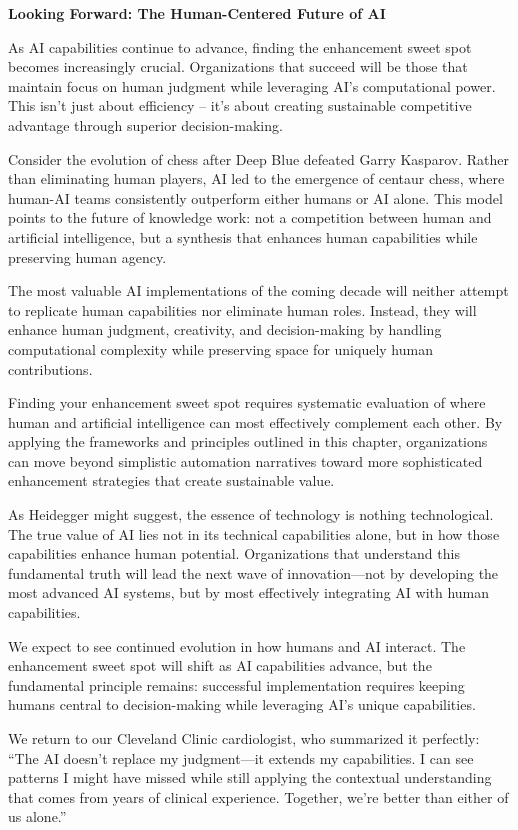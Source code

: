 \documentclass[
  Letterpaper,
]{scrbook}
\begin{document}
\textbf{Looking Forward: The Human-Centered Future of AI}

As AI capabilities continue to advance, finding the enhancement sweet
spot becomes increasingly crucial. Organizations that succeed will be
those that maintain focus on human judgment while leveraging AI's
computational power. This isn't just about efficiency -- it's about
creating sustainable competitive advantage through superior
decision-making.

Consider the evolution of chess after Deep Blue defeated Garry Kasparov.
Rather than eliminating human players, AI led to the emergence of
centaur chess, where human-AI teams consistently outperform either
humans or AI alone. This model points to the future of knowledge work:
not a competition between human and artificial intelligence, but a
synthesis that enhances human capabilities while preserving human
agency.

The most valuable AI implementations of the coming decade will neither
attempt to replicate human capabilities nor eliminate human roles.
Instead, they will enhance human judgment, creativity, and
decision-making by handling computational complexity while preserving
space for uniquely human contributions.

Finding your enhancement sweet spot requires systematic evaluation of
where human and artificial intelligence can most effectively complement
each other. By applying the frameworks and principles outlined in this
chapter, organizations can move beyond simplistic automation narratives
toward more sophisticated enhancement strategies that create sustainable
value.

As Heidegger might suggest, the essence of technology is nothing
technological. The true value of AI lies not in its technical
capabilities alone, but in how those capabilities enhance human
potential. Organizations that understand this fundamental truth will
lead the next wave of innovation---not by developing the most advanced
AI systems, but by most effectively integrating AI with human
capabilities.

We expect to see continued evolution in how humans and AI interact. The
enhancement sweet spot will shift as AI capabilities advance, but the
fundamental principle remains: successful implementation requires
keeping humans central to decision-making while leveraging AI's unique
capabilities.

We return to our Cleveland Clinic cardiologist, who summarized it
perfectly: ``The AI doesn't replace my judgment---it extends my
capabilities. I can see patterns I might have missed while still
applying the contextual understanding that comes from years of clinical
experience. Together, we're better than either of us alone.''
\end{document}
